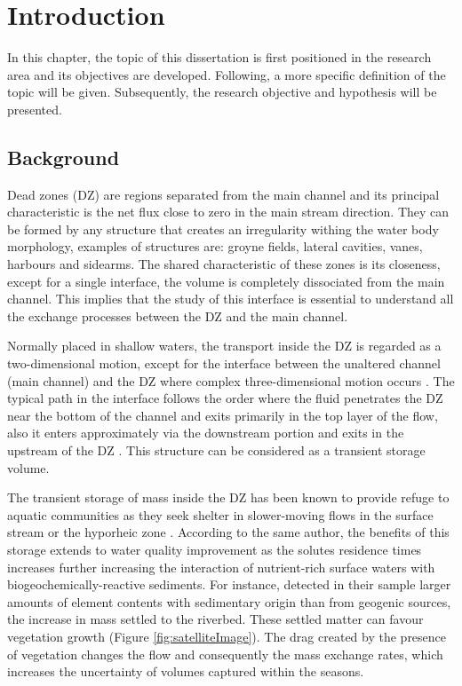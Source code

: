 \chapter{Introduction}
\label{chap:introduction}
In this chapter, the topic of this dissertation is first positioned in the research area and its objectives are developed. Following, a more specific definition of the topic will be given. Subsequently, the research objective and hypothesis will be presented.
\section{Background}
Dead zones (DZ) are regions separated from the main channel and its principal characteristic is the net flux close to zero in the main stream direction. They can be formed by any structure that creates an irregularity withing the water body morphology, examples of structures are: groyne fields, lateral cavities, vanes, harbours and sidearms. The shared characteristic of these zones is its closeness, except for a single interface, the volume is completely dissociated from the main channel. This implies that the study of this interface is essential to understand all the exchange processes between the DZ and the main channel.

Normally placed in shallow waters, the transport inside the DZ is regarded as a two-dimensional motion, except for the interface between the unaltered channel (main channel) and the DZ where complex three-dimensional motion occurs \cite{xiang2020}. The typical path in the interface follows the order where the fluid penetrates the DZ near the bottom of the channel and exits primarily in the top layer of the flow, also it enters approximately via the downstream portion and exits in the upstream of the DZ \cite{weitbrecht2004,xiang2020}. This structure can be considered as a transient storage volume.

The transient storage of mass inside the DZ has been known to provide refuge to aquatic communities as they seek shelter in slower-moving flows in the surface stream or the hyporheic zone \cite{jackson2013}. According to the same author, the benefits of this storage extends to water quality improvement as the solutes residence times increases further increasing the interaction of nutrient-rich surface waters with biogeochemically-reactive sediments. For instance, \textcite{SchwartzKozerski2003} detected in their sample larger amounts of element contents with sedimentary origin than from geogenic sources, the increase in mass settled to the riverbed. These settled matter can favour vegetation growth (Figure \ref{fig:satelliteImage}). The drag created by the presence of vegetation changes the flow and consequently the mass exchange rates, which increases the uncertainty of volumes captured within the seasons.

